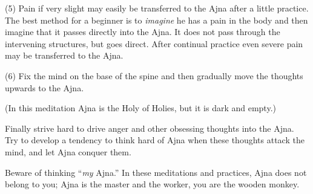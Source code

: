 (5) Pain if very slight may easily be transferred to the Ajna after a little practice. The best method for a beginner is to \textit{imagine} he has a pain in the body and then imagine that it passes directly into the Ajna. It does not pass through the intervening structures, but goes direct. After continual practice even severe pain may be transferred to the Ajna.

(6) Fix the mind on the base of the spine and then gradually move the thoughts upwards to the Ajna.

(In this meditation Ajna is the Holy of Holies, but it is dark and empty.)

Finally strive hard to drive anger and other obsessing thoughts into the Ajna. Try to develop a tendency to think hard of Ajna when these thoughts attack the mind, and let Ajna conquer them.

Beware of thinking \enquote{\textit{my} Ajna.} In these meditations and practices, Ajna does not belong to you; Ajna is the master and the worker, you are the wooden monkey.
